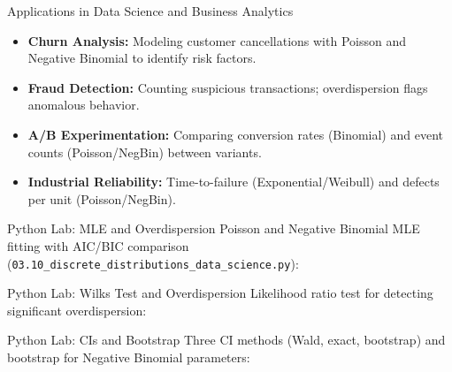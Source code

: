 \documentclass[aspectratio=169,xcolor={dvipsnames,table}]{beamer}
\begin{document}
\begin{frame}{Applications in Data Science and Business Analytics}
	\vspace{-0.1cm}
	\begin{itemize}\itemsep=0.1cm
		\item \textbf{Churn Analysis:} Modeling customer cancellations with Poisson and Negative Binomial to identify risk factors. \pause
		\item \textbf{Fraud Detection:} Counting suspicious transactions; overdispersion flags anomalous behavior. \pause
		\item \textbf{A/B Experimentation:} Comparing conversion rates (Binomial) and event counts (Poisson/NegBin) between variants. \pause
		\item \textbf{Industrial Reliability:} Time-to-failure (Exponential/Weibull) and defects per unit (Poisson/NegBin).
	\end{itemize}
\end{frame}

\begin{frame}[fragile]{Python Lab: MLE and Overdispersion}
	\vspace{-0.05cm}
	\scriptsize
	Poisson and Negative Binomial MLE fitting with AIC/BIC comparison (\texttt{03.10\_discrete\_distributions\_data\_science.py}):
	\vspace{0.02cm}
	{
	}
\end{frame}

\begin{frame}[fragile]{Python Lab: Wilks Test and Overdispersion}
	\vspace{-0.05cm}
	\scriptsize
	Likelihood ratio test for detecting significant overdispersion:
	\vspace{0.02cm}
	{
	}
\end{frame}

\begin{frame}[fragile]{Python Lab: CIs and Bootstrap}
	\vspace{-0.05cm}
	\scriptsize
	Three CI methods (Wald, exact, bootstrap) and bootstrap for Negative Binomial parameters:
	\vspace{0.02cm}
	{
	}
\end{frame}
\end{document}
